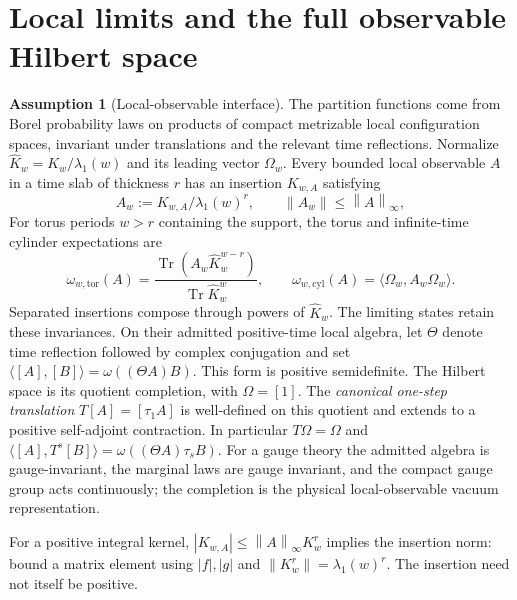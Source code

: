 \documentclass[11pt]{article}
\theoremstyle{definition}
\newtheorem{assumption}[theorem]{Assumption}
\theoremstyle{remark}
\newcommand{\Tr}{\operatorname{Tr}}
\newcommand{\norm}[1]{\left\lVert#1\right\rVert}
\newcommand{\ip}[2]{\langle#1,#2\rangle}
\begin{document}
\section{Local limits and the full observable Hilbert space}\label{sec:local}
\begin{assumption}[Local-observable interface]\label{ass:local}
The partition functions come from Borel probability laws on products of
compact metrizable local configuration spaces, invariant under translations
and the relevant time reflections. Normalize $\widehat K_w=K_w/\lambda_1(w)$ and its
leading vector $\Omega_w$. Every bounded local observable $A$ in a time
slab of thickness $r$ has an insertion $K_{w,A}$ satisfying
\[
 A_w:=K_{w,A}/\lambda_1(w)^r,\qquad\norm{A_w}\le\norm{A}_\infty,
\]
For torus periods $w>r$ containing the support, the torus and infinite-time
cylinder expectations are
\[
 \omega_{w,\mathrm{tor}}(A)=
 \frac{\Tr(A_w\widehat K_w^{w-r})}{\Tr\widehat K_w^w},\qquad
 \omega_{w,\mathrm{cyl}}(A)=\ip{\Omega_w}{A_w\Omega_w}.
\]
Separated insertions compose through powers of $\widehat K_w$.
The limiting states retain these invariances. On their admitted positive-time
local algebra, let $\Theta$ denote time reflection followed by complex
conjugation and set $\ip{[A]}{[B]}=\omega((\Theta A)B)$.
This form is positive semidefinite. The Hilbert space is its quotient
completion, with $\Omega=[1]$. The \emph{canonical one-step translation}
$T[A]=[\tau_1A]$ is well-defined on this quotient and extends to a positive
self-adjoint contraction. In particular $T\Omega=\Omega$ and
$\ip{[A]}{T^s[B]}=\omega((\Theta A)\tau_sB)$.
For a gauge theory the admitted algebra is gauge-invariant, the marginal
laws are gauge invariant, and the compact gauge group acts continuously;
the completion is the physical local-observable vacuum representation.
\end{assumption}
For a positive integral kernel, $|K_{w,A}|\le\norm{A}_\infty K_w^r$
implies the insertion norm: bound a matrix element using $|f|,|g|$ and
$\norm{K_w^r}=\lambda_1(w)^r$. The insertion need not itself be positive.
\end{document}
